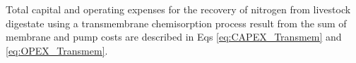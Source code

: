 \begin{refsection}[referencesCh6]

Total capital and operating expenses for the recovery of nitrogen from livestock digestate using a transmembrane chemisorption process result from the sum of membrane and pump costs are described in Eqs \ref{eq:CAPEX_Transmem} and \ref{eq:OPEX_Transmem}.


\end{refsection}
